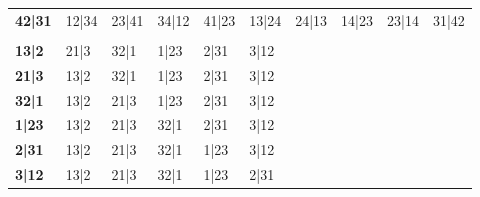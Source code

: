 \documentclass[letterpaper]{article}
\begin{document}
\begin{minipage}[t]{0.48\linewidth}
\begin{tabular}{@{}llllllllll@{}}
\textbf{42|31} & 12|34 & 23|41 & 34|12 & 41|23 & 13|24 & 24|13 & 14|23 & 23|14 & 31|42 \\
\rowcolor{headerbg}\multicolumn{10}{l}{\color{white}\textbf{3-finger pairs}}\\
\rowcolor{altrow}
\textbf{13|2} & 21|3 & 32|1 & 1|23 & 2|31 & 3|12 &  &  &  &  \\
\textbf{21|3} & 13|2 & 32|1 & 1|23 & 2|31 & 3|12 &  &  &  &  \\
\rowcolor{altrow}
\textbf{32|1} & 13|2 & 21|3 & 1|23 & 2|31 & 3|12 &  &  &  &  \\
\textbf{1|23} & 13|2 & 21|3 & 32|1 & 2|31 & 3|12 &  &  &  &  \\
\rowcolor{altrow}
\textbf{2|31} & 13|2 & 21|3 & 32|1 & 1|23 & 3|12 &  &  &  &  \\
\textbf{3|12} & 13|2 & 21|3 & 32|1 & 1|23 & 2|31 &  &  &  &  \\
\end{tabular}
\end{minipage}\hfill
\end{document}

